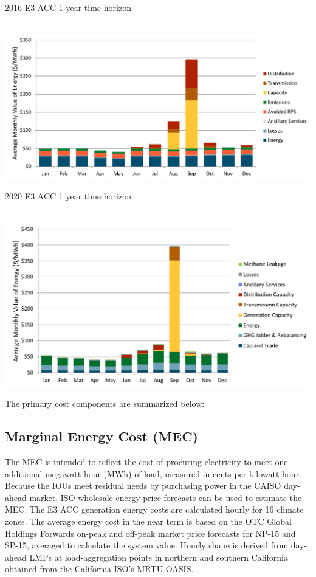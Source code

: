 \documentclass[11pt]{article}
\begin{document}
\bigskip

 \caption{2016 E3 ACC  1 year time horizon} \\
\includegraphics[scale=0.7]{ACC2016.png}


\bigskip

 \caption{2020 E3 ACC  1 year time horizon} \\
\includegraphics[scale=0.75]{ACC2020.png}


The primary cost components are summarized below:

\subsection{Marginal Energy Cost (MEC)}

The MEC is intended to reflect the cost of procuring electricity to meet one additional megawatt-hour (MWh) of load, measured in cents per kilowatt-hour.  Because the IOUs meet residual needs by purchasing power in the CAISO day-ahead market, ISO wholesale energy price forecasts can be used to estimate the MEC. The E3 ACC generation energy costs are calculated hourly for 16 climate zones. The average energy cost in the near term is based on the OTC Global Holdings Forwards on-peak and off-peak market price forecasts for NP-15 and SP-15, averaged to calculate the system value. Hourly shape is derived from day-ahead LMPs at load-aggregation points in northern and southern California obtained from the California ISO’s MRTU OASIS. 
\end{document}
